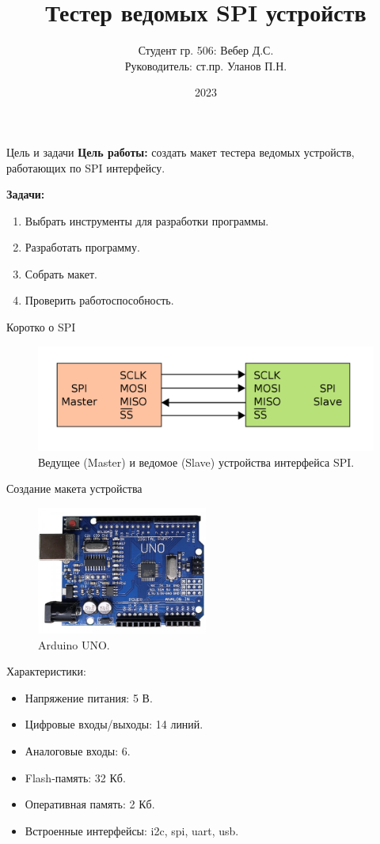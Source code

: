 \documentclass[10pt]{beamer}
\begin{document}
\title{Тестер ведомых SPI устройств}
\author{Студент гр. 506: Вебер Д.С.\\Руководитель:  ст.пр. Уланов П.Н.}
\date{2023}


\frame{\titlepage}

\begin{frame}{Цель и задачи}
  \textbf{Цель работы:} создать макет тестера ведомых устройств, работающих
по SPI интерфейсу.

  \textbf{Задачи:} 
  \begin{enumerate}
  \item Выбрать инструменты для разработки программы.
  \item Разработать программу.
  \item Собрать макет.
  \item Проверить работоспособность.
  \end{enumerate}
\end{frame}

\begin{frame}{Коротко о SPI}
  \begin{figure}
  \includegraphics[width=1\textwidth]{spi}
  \caption{Ведущее (Master) и ведомое (Slave) устройства интерфейса SPI.}
  \end{figure}
\end{frame}


\begin{frame}{Создание макета устройства}
  \begin{figure}
  \includegraphics[width=0.5\textwidth]{uno}
  \caption{Arduino UNO.}
  \end{figure}
  Характеристики:
  \begin{itemize}
	\item Напряжение питания: 5 В.
	\item Цифровые входы/выходы: 14 линий.
	\item Аналоговые входы: 6.
	\item Flash-память: 32 Кб.
	\item Оперативная память: 2 Кб.
	\item Встроенные интерфейсы: i2c, spi, uart, usb.
  \end{itemize}
\end{frame}
\end{document}
